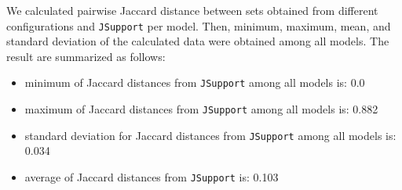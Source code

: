 We calculated pairwise Jaccard distance between sets obtained from different configurations and \texttt{JSupport} per model. Then, minimum, maximum, mean, and standard deviation of the calculated data were obtained among all models.
The result are summarized as follows:
\begin{itemize}
  \item minimum of Jaccard distances from \texttt{JSupport} among all models is: 0.0
  \item maximum of Jaccard distances from \texttt{JSupport} among all models is: 0.882
  \item standard deviation for Jaccard distances from \texttt{JSupport} among all models is: 0.034
  \item average of Jaccard distances from \texttt{JSupport} is: 0.103
\end{itemize}

